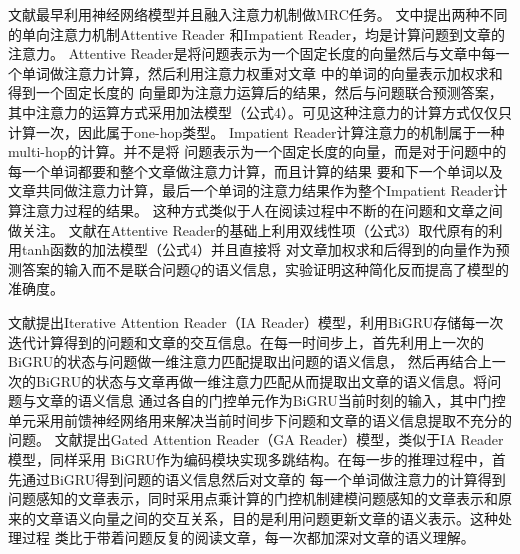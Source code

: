 文献\cite{Hermann}最早利用神经网络模型并且融入注意力机制做MRC任务。
文中提出两种不同的单向注意力机制Attentive Reader
和Impatient Reader，均是计算问题到文章的注意力。
Attentive Reader是将问题表示为一个固定长度的向量然后与文章中每一个单词做注意力计算，然后利用注意力权重对文章
中的单词的向量表示加权求和得到一个固定长度的
向量即为注意力运算后的结果，然后与问题联合预测答案，其中注意力的运算方式采用加法模型（公式4）。可见这种注意力的计算方式仅仅只计算一次，因此属于one-hop类型。
Impatient Reader计算注意力的机制属于一种multi-hop的计算。并不是将
问题表示为一个固定长度的向量，而是对于问题中的每一个单词都要和整个文章做注意力计算，而且计算的结果
要和下一个单词以及文章共同做注意力计算，最后一个单词的注意力结果作为整个Impatient Reader计算注意力过程的结果。
这种方式类似于人在阅读过程中不断的在问题和文章之间做关注。
文献\cite{AR}在Attentive Reader的基础上利用双线性项（公式3）取代原有的利用tanh函数的加法模型（公式4）并且直接将
对文章加权求和后得到的向量作为预测答案的输入而不是联合问题$Q$的语义信息，实验证明这种简化反而提高了模型的准确度。

文献\cite{IAReader}提出Iterative Attention Reader（IA Reader）模型，利用BiGRU存储每一次
迭代计算得到的问题和文章的交互信息。在每一时间步上，首先利用上一次的BiGRU的状态与问题做一维注意力匹配提取出问题的语义信息，
然后再结合上一次的BiGRU的状态与文章再做一维注意力匹配从而提取出文章的语义信息。将问题与文章的语义信息
通过各自的门控单元作为BiGRU当前时刻的输入，其中门控单元采用前馈神经网络用来解决当前时间步下问题和文章的语义信息提取不充分的问题。
文献\cite{GAReader}提出Gated Attention Reader（GA Reader）模型，类似于IA Reader模型，同样采用
BiGRU作为编码模块实现多跳结构。在每一步的推理过程中，首先通过BiGRU得到问题的语义信息然后对文章的
每一个单词做注意力的计算得到问题感知的文章表示，同时采用点乘计算的门控机制建模问题感知的文章表示和原来的文章语义向量之间的交互关系，目的是利用问题更新文章的语义表示。这种处理过程
类比于带着问题反复的阅读文章，每一次都加深对文章的语义理解。


